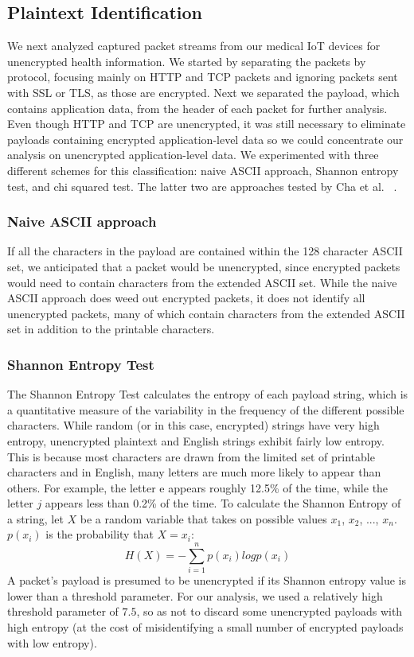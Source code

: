 \subsection{Plaintext Identification}

We next analyzed captured packet streams from our medical IoT devices for unencrypted health information. We started by separating the packets by protocol, focusing mainly on HTTP and TCP packets and ignoring packets sent with SSL or TLS, as those are encrypted. Next we separated the payload, which contains application data, from the header of each packet for further analysis. Even though HTTP and TCP are unencrypted, it was still necessary to eliminate payloads containing encrypted application-level data so we could concentrate our analysis on unencrypted application-level data. We experimented with three different schemes for this classification: naive ASCII approach, Shannon entropy test, and chi squared test. The latter two are approaches tested by Cha et al. ~\cite{chaMachineLearning}.

\subsubsection{Naive ASCII approach}
If all the characters in the payload are contained within the 128 character ASCII set, we anticipated that a packet would be unencrypted, since encrypted packets would need to contain characters from the extended ASCII set. While the naive ASCII approach does weed out encrypted packets, it does not identify all unencrypted packets, many of which contain characters from the extended ASCII set in addition to the printable characters. 

\subsubsection{Shannon Entropy Test}
The Shannon Entropy Test calculates the entropy of each payload string, which is a quantitative measure of the variability in the frequency of the different possible characters. While random (or in this case, encrypted) strings have very high entropy, unencrypted plaintext and English strings exhibit fairly low entropy. This is because most characters are drawn from the limited set of printable characters and in English, many letters are much more likely to appear than others. For example, the letter e appears roughly 12.5\% of the time, while the letter $j$ appears less than 0.2\% of the time. To calculate the Shannon Entropy of a string, let $X$ be a random variable that takes on possible values $x_1$, $x_2$, ..., $x_n$. $p(x_i)$ is the probability that $X = x_i$:
$$H(X) = - \sum_{i = 1}^{n} p(x_i) log p(x_i)$$
A packet's payload is presumed to be unencrypted if its Shannon entropy value is lower than a threshold parameter. For our analysis, we used a relatively high threshold parameter of $7.5$, so as not to discard some unencrypted payloads with high entropy (at the cost of misidentifying a small number of encrypted payloads with low entropy).

